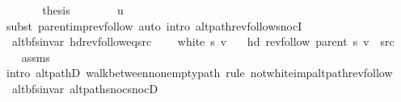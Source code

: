 \begin{isabellebody}
\ \ \ \ \isamarkupfalse%
\ \isamarkupfalse%
\ {\isacharquery}{\kern0pt}thesis\isanewline
\ \ \ \ \ \ \isamarkupfalse%
\ u\isanewline
\ \ \ \ \ \ \isamarkupfalse%
\ {\isacharparenleft}{\kern0pt}subst\ parent{\isacharunderscore}{\kern0pt}imp{\isacharunderscore}{\kern0pt}rev{\isacharunderscore}{\kern0pt}follow{\isacharparenright}{\kern0pt}\ {\isacharparenleft}{\kern0pt}auto\ intro{\isacharcolon}{\kern0pt}\ alt{\isacharunderscore}{\kern0pt}path{\isacharunderscore}{\kern0pt}rev{\isacharunderscore}{\kern0pt}follow{\isacharunderscore}{\kern0pt}snocI{\isacharparenright}{\kern0pt}\isanewline
\ \ \isamarkupfalse%
\isanewline
{}\isamarkupfalse%
%
\endisatagproof
{\isafoldproof}%
%
\isadelimproof
\isanewline
%
\endisadelimproof
\isanewline
{}\isamarkupfalse%
\ {\isacharparenleft}{\kern0pt}\ alt{\isacharunderscore}{\kern0pt}bfs{\isacharunderscore}{\kern0pt}invar{\isacharparenright}{\kern0pt}\ hd{\isacharunderscore}{\kern0pt}rev{\isacharunderscore}{\kern0pt}follow{\isacharunderscore}{\kern0pt}eq{\isacharunderscore}{\kern0pt}src{\isacharcolon}{\kern0pt}\isanewline
\ \ \ {\isachardoublequoteopen}{\isasymnot}\ white\ s\ v{\isachardoublequoteclose}\isanewline
\ \ \ {\isachardoublequoteopen}hd\ {\isacharparenleft}{\kern0pt}rev{\isacharunderscore}{\kern0pt}follow\ {\isacharparenleft}{\kern0pt}parent\ s{\isacharparenright}{\kern0pt}\ v{\isacharparenright}{\kern0pt}\ {\isacharequal}{\kern0pt}\ src{\isachardoublequoteclose}\isanewline
%
\isadelimproof
\ \ %
\endisadelimproof
%
\isatagproof
{}\isamarkupfalse%
\ assms\isanewline
\ \ \isamarkupfalse%
\ {\isacharparenleft}{\kern0pt}intro\ alt{\isacharunderscore}{\kern0pt}pathD{\isacharparenleft}{\kern0pt}{}{\isacharparenright}{\kern0pt}\ walk{\isacharunderscore}{\kern0pt}between{\isacharunderscore}{\kern0pt}nonempty{\isacharunderscore}{\kern0pt}path{\isacharparenleft}{\kern0pt}{}{\isacharparenright}{\kern0pt}{\isacharparenright}{\kern0pt}\ {\isacharparenleft}{\kern0pt}rule\ not{\isacharunderscore}{\kern0pt}white{\isacharunderscore}{\kern0pt}imp{\isacharunderscore}{\kern0pt}alt{\isacharunderscore}{\kern0pt}path{\isacharunderscore}{\kern0pt}rev{\isacharunderscore}{\kern0pt}follow{\isacharparenright}{\kern0pt}%
\endisatagproof
{\isafoldproof}%
%
\isadelimproof
\isanewline
%
\endisadelimproof
\isanewline
{}\isamarkupfalse%
\ {\isacharparenleft}{\kern0pt}\ alt{\isacharunderscore}{\kern0pt}bfs{\isacharunderscore}{\kern0pt}invar{\isacharparenright}{\kern0pt}\ alt{\isacharunderscore}{\kern0pt}path{\isacharunderscore}{\kern0pt}snoc{\isacharunderscore}{\kern0pt}snocD{\isacharcolon}{\kern0pt}\isanewline

\end{isabellebody}
